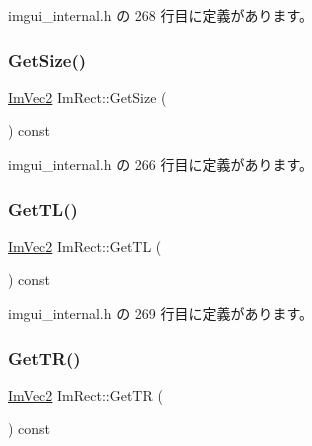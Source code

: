  imgui\+\_\+internal.\+h の 268 行目に定義があります。

\mbox{\label{struct_im_rect_ae459d9c50003058cfb34519a571aaf33}} 
\subsubsection{\texorpdfstring{Get\+Size()}{GetSize()}}
{\footnotesize\ttfamily \mbox{\hyperlink{struct_im_vec2}{Im\+Vec2}} Im\+Rect\+::\+Get\+Size (\begin{DoxyParamCaption}{ }\end{DoxyParamCaption}) const\hspace{0.3cm}{\ttfamily [inline]}}



 imgui\+\_\+internal.\+h の 266 行目に定義があります。

\mbox{\label{struct_im_rect_a1d4d972329722b51dca4499cb5931b4b}} 
\subsubsection{\texorpdfstring{Get\+T\+L()}{GetTL()}}
{\footnotesize\ttfamily \mbox{\hyperlink{struct_im_vec2}{Im\+Vec2}} Im\+Rect\+::\+Get\+TL (\begin{DoxyParamCaption}{ }\end{DoxyParamCaption}) const\hspace{0.3cm}{\ttfamily [inline]}}



 imgui\+\_\+internal.\+h の 269 行目に定義があります。

\mbox{\label{struct_im_rect_acae90248a96be4acf1524071fca1c3f3}} 
\subsubsection{\texorpdfstring{Get\+T\+R()}{GetTR()}}
{\footnotesize\ttfamily \mbox{\hyperlink{struct_im_vec2}{Im\+Vec2}} Im\+Rect\+::\+Get\+TR (\begin{DoxyParamCaption}{ }\end{DoxyParamCaption}) const\hspace{0.3cm}{\ttfamily [inline]}}



